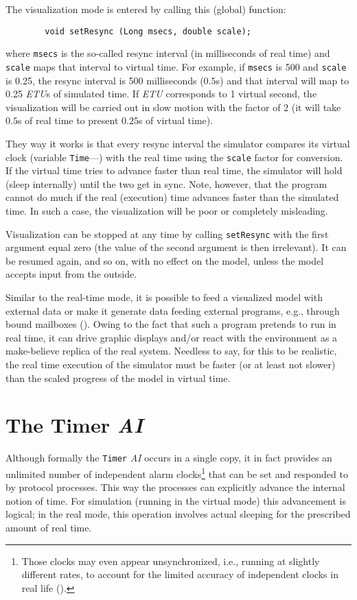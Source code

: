 The visualization mode is entered by calling this (global) function:
\begin{verbatim}
        void setResync (Long msecs, double scale);
\end{verbatim}
\noindent
where {\tt msecs} is the so-called resync interval (in milliseconds of real
time) and {\tt scale} maps that interval to virtual time.
For example, if {\tt msecs} is 500 and {\tt scale} is 0.25, the resync
interval is 500 milliseconds ($0.5$s) and that interval will map to
0.25 {\em ETU\/}s of simulated time. 
If {\em ETU\/} corresponds to 1 virtual second, the visualization will be
carried out in slow motion with the factor of 2 (it will take $0.5$s of real
time to present $0.25$s of virtual time).

They way it works is that every resync interval the simulator compares its
virtual clock (variable {\tt Time}---)
with the real time using the {\tt scale} factor for conversion.
If the virtual time tries to advance faster than real time, the simulator
will hold (sleep internally) until the two get in sync.
Note, however, that the program cannot do much if the real (execution)
time advances faster than the simulated time.
In such a case, the visualization will be poor or completely misleading.

Visualization can be stopped at any time by calling
{\tt setResync} with the first argument equal zero (the value of the second
argument is then irrelevant).
It can be resumed again, and so on, with no effect on the model, unless the
model accepts input from the outside.

Similar to the real-time mode, it is possible to feed a visualized model
with external data or make it generate data feeding external programs, e.g.,
through bound mailboxes ().
Owing to the fact that such a program pretends to run in real time, it can
drive graphic displays and/or react with the environment as a make-believe
replica of the real system.
Needless to say, for this to be realistic, the real time execution of the
simulator must be faster (or at least not slower) than the scaled progress
of the model in virtual time.

\section{The Timer {\em AI}}
\label{rm_ti}

Although formally the {\tt Timer} {\em AI\/} occurs
in a single copy, it in fact provides an unlimited number of independent
alarm clocks\footnote{Those clocks may even appear unsynchronized, i.e.,
running at slightly different rates, to account for the limited accuracy of
independent clocks in real life ().}
that can be set and responded to by protocol processes.
This way the processes can explicitly advance the internal notion of time.
For simulation (running in the virtual mode) this advancement is logical;
in the real mode, this operation involves actual sleeping for the prescribed
amount of real time.

